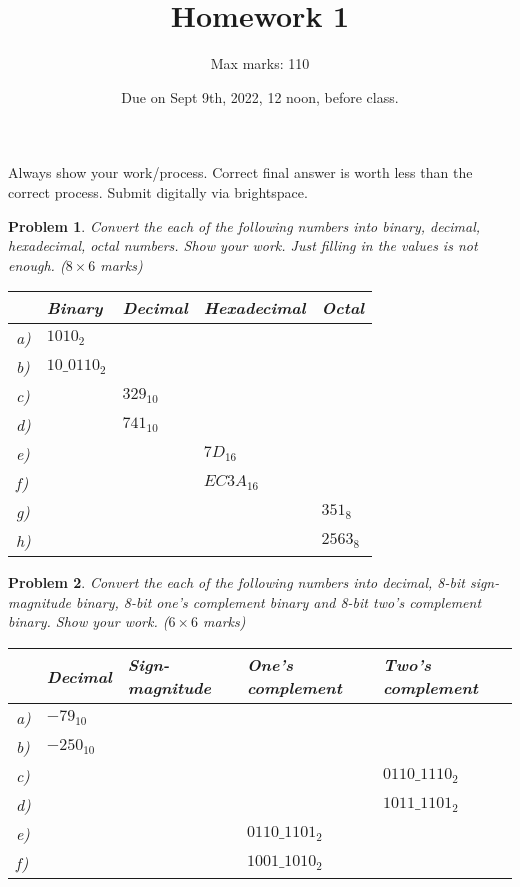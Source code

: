 \documentclass{article}
\title{Homework 1}
\author{Max marks: 110}
\date{Due on Sept 9th, 2022, 12 noon, before class. }
\newtheorem{prob}{Problem}
\begin{document}
\maketitle
Always show your work/process. Correct final answer is worth less than the
correct process. Submit digitally via brightspace.

\begin{prob}
  Convert the each of the following numbers into binary, decimal, hexadecimal,
octal numbers. Show your work. Just filling in the values is not enough. ($8 \times 6 $ marks)

  \begin{tabular}{lllll}
    \toprule
     & Binary & Decimal & Hexadecimal & Octal \\
    \midrule
    a)& $1010_2$     &   &   &    \\
    b)& $10\_0110_2$ &   &   &   \\
    c)&   & $329_{10}$   &   &   \\
    d)&   & $741_{10}$   &   &   \\
    e)&   &   & $7D_{16}$    &   \\
    f)&   &   & $EC3A_{16}$  &   \\
    g)&   &   &   & $351_8$\\
    h)&   &   &   & $2563_8$\\
    \bottomrule
  \end{tabular}
\end{prob}

\vspace{20em}

\begin{prob}
  Convert the each of the following numbers into decimal, 8-bit sign-magnitude binary,
  8-bit one's complement binary and 8-bit two's complement binary. Show your work. ($6 \times 6 $ marks)

  \begin{tabular}{lllll}
    \toprule
    & Decimal & Sign-magnitude & One's complement & Two's complement \\
    \midrule
    a) & $-79_{10}$ & & & \\
    b) & $-250_{10}$ & & & \\
    c) & & & & $0110\_1110_2$ \\
    d) & &  & & $1011\_1101_2$\\
    e) & & & $0110\_1101_2$&  \\
    f) & &  & $1001\_1010_2$& \\
    \bottomrule
  \end{tabular}
\end{prob}
\end{document}
